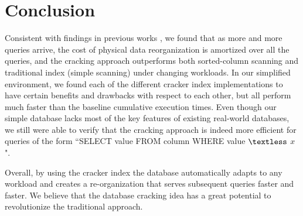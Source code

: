 \section{Conclusion}
Consistent with findings in previous works \cite{idreos_2007, schuhknecht_2014}, we found that as more and more queries arrive, the cost of physical data reorganization is amortized over all the queries, and the cracking approach outperforms both sorted-column scanning and traditional index (simple scanning) under changing workloads. In our simplified environment, we found each of the different cracker index implementations to have certain benefits and drawbacks with respect to each other, but all perform much faster than the baseline cumulative execution times. Even though our simple database lacks most of the key features of existing real-world databases, we still were able to verify that the cracking approach is indeed more efficient for queries of the form ``SELECT value  FROM column WHERE value  $\textless$ $x$". 

Overall, by using the cracker index the database automatically adapts to any workload and creates a re-organization that serves subsequent queries faster and faster. We believe that the database cracking idea has a great potential to revolutionize the traditional approach.
\label{sec:conclusion}

